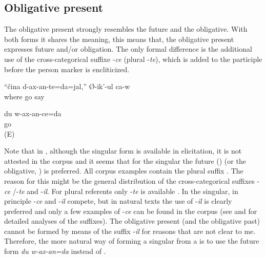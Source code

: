 \subsection{Obligative present}
\label{ssec:Obligative present}

The obligative present strongly resembles the future and the obligative. With both forms it shares the meaning, this means that, the obligative present expresses future and/or obligation. The only formal difference is the additional use of the cross-categorical suffixe -\textit{ce} (plural -\textit{te}), which is added to the participle before the person marker is encliticized.
%
\begin{exe}
	\ex	\label{ex:‎Where will you (pl) go he says}
	\gll	``čina	d-ax-an-te=da=jal,''	Ø-ik'-ul	ca-w	\\
		where	go	say		\\
	\glt	{}

	\ex	\label{ex:I will go / have to go analytic}
	\gll	du	w-ax-an-ce=da\\
			go\\
	\glt	{} (E)
\end{exe}

Note that in , although the singular form  is available in elicitation, it is not attested in the corpus and it seems that for the singular the future () (or the obligative, ) is preferred. All corpus examples contain the plural suffix . The reason for this might be the general distribution of the cross-categorical suffixes -\textit{ce} /-\textit{te} and -\textit{il}. For plural referents only -\textit{te} is available . In the singular, in principle -\textit{ce} and -\textit{il} compete, but in natural texts the use of -\textit{il} is clearly preferred and only a few examples of -\textit{ce} can be found in the corpus (see  and  for detailed analyses of the suffixes). The obligative present (and the obligative past) cannot be formed by means of the suffix -\textit{il} for reasons that are not clear to me. Therefore, the more natural way of forming a singular from a   is to use the future form \textit{du w-ax-an=da} instead of .

